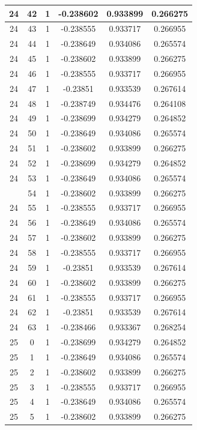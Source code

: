 \documentclass[12pt,a4paper]{article}
\numberwithin{equation}{section}
\numberwithin{figure}{section}
\numberwithin{table}{section}
\begin{document}
\begin{longtable}{|c|c|c|c|c|c|}
24 & 42 & 1 & -0.238602 & 0.933899 & 0.266275 \\ \hline
24 & 43 & 1 & -0.238555 & 0.933717 & 0.266955 \\ \hline
24 & 44 & 1 & -0.238649 & 0.934086 & 0.265574 \\ \hline
24 & 45 & 1 & -0.238602 & 0.933899 & 0.266275 \\ \hline
24 & 46 & 1 & -0.238555 & 0.933717 & 0.266955 \\ \hline
24 & 47 & 1 & -0.23851 & 0.933539 & 0.267614 \\ \hline
24 & 48 & 1 & -0.238749 & 0.934476 & 0.264108 \\ \hline
24 & 49 & 1 & -0.238699 & 0.934279 & 0.264852 \\ \hline
24 & 50 & 1 & -0.238649 & 0.934086 & 0.265574 \\ \hline
24 & 51 & 1 & -0.238602 & 0.933899 & 0.266275 \\ \hline
24 & 52 & 1 & -0.238699 & 0.934279 & 0.264852 \\ \hline
24 & 53 & 1 & -0.238649 & 0.934086 & 0.265574 \\ \hline
\pagebreak
24 & 54 & 1 & -0.238602 & 0.933899 & 0.266275 \\ \hline
24 & 55 & 1 & -0.238555 & 0.933717 & 0.266955 \\ \hline
24 & 56 & 1 & -0.238649 & 0.934086 & 0.265574 \\ \hline
24 & 57 & 1 & -0.238602 & 0.933899 & 0.266275 \\ \hline
24 & 58 & 1 & -0.238555 & 0.933717 & 0.266955 \\ \hline
24 & 59 & 1 & -0.23851 & 0.933539 & 0.267614 \\ \hline
24 & 60 & 1 & -0.238602 & 0.933899 & 0.266275 \\ \hline
24 & 61 & 1 & -0.238555 & 0.933717 & 0.266955 \\ \hline
24 & 62 & 1 & -0.23851 & 0.933539 & 0.267614 \\ \hline
24 & 63 & 1 & -0.238466 & 0.933367 & 0.268254 \\ \hline
25 & 0 & 1 & -0.238699 & 0.934279 & 0.264852 \\ \hline
25 & 1 & 1 & -0.238649 & 0.934086 & 0.265574 \\ \hline
25 & 2 & 1 & -0.238602 & 0.933899 & 0.266275 \\ \hline
25 & 3 & 1 & -0.238555 & 0.933717 & 0.266955 \\ \hline
25 & 4 & 1 & -0.238649 & 0.934086 & 0.265574 \\ \hline
25 & 5 & 1 & -0.238602 & 0.933899 & 0.266275 \\ \hline

\end{longtable}
\end{document}
